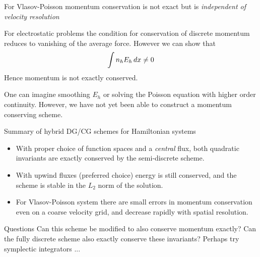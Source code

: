 \documentclass[pdf]{beamer}
\newcommand{\mypause}{}
\theoremstyle{definition}
\begin{document}
\begin{frame}{For Vlasov-Poisson momentum conservation is not exact
    but is \emph{independent of velocity resolution}}%

  For electrostatic problems the condition for conservation of
  discrete momentum reduces to vanishing of the average force. However
  we can show that
  \begin{align*}
    \int n_h E_h\thinspace dx \ne 0
  \end{align*}
  Hence momentum is not exactly conserved.

  \mypause One can imagine smoothing $E_h$ or solving the Poisson
  equation with higher order continuity. However, we have not yet been
  able to construct a momentum conserving scheme.
\end{frame}

\begin{frame}{Summary of hybrid DG/CG schemes for Hamiltonian systems}

  \begin{itemize}
  \item With proper choice of function spaces and a \emph{central}
    flux, both quadratic invariants are exactly conserved by the
    semi-discrete scheme.
  \item With upwind fluxes (preferred choice) energy is still
    conserved, and the scheme is stable in the $L_2$ norm of the
    solution.
  \item For Vlasov-Poisson system there are small errors in momentum
    conservation even on a coarse velocity grid, and decrease rapidly
    with spatial resolution.
  \end{itemize}
  \mypause
  \begin{block}{Questions}
    Can this scheme be modified to also conserve momentum exactly? Can
    the fully discrete scheme also exactly conserve these invariants?
    Perhaps try symplectic integrators ...
  \end{block}

\end{frame}
\end{document}
